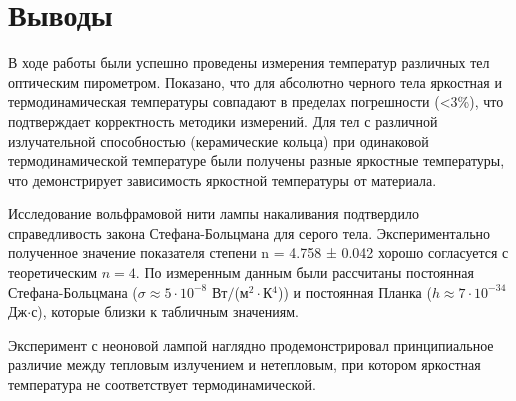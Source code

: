 \documentclass[a4paper,12pt]{article}
\begin{document}
\section{Выводы}
В ходе работы были успешно проведены измерения температур различных тел оптическим пирометром. Показано, что для абсолютно черного тела яркостная и термодинамическая температуры совпадают в пределах погрешности (<3\%), что подтверждает корректность методики измерений. Для тел с различной излучательной способностью (керамические кольца) при одинаковой термодинамической температуре были получены разные яркостные температуры, что демонстрирует зависимость яркостной температуры от материала.

Исследование вольфрамовой нити лампы накаливания подтвердило справедливость закона Стефана-Больцмана для серого тела. Экспериментально полученное значение показателя степени n = 4.758 ± 0.042 хорошо согласуется с теоретическим $n=4$. По измеренным данным были рассчитаны постоянная Стефана-Больцмана ($\sigma \approx 5\cdot10^{-8}$ Вт$/$(м$^2\cdot$К$^4$)) и постоянная Планка ($h \approx 7\cdot10^{-34} $Дж$\cdot$с), которые близки к табличным значениям.

Эксперимент с неоновой лампой наглядно продемонстрировал принципиальное различие между тепловым излучением и нетепловым, при котором яркостная температура не соответствует термодинамической.
\end{document}
